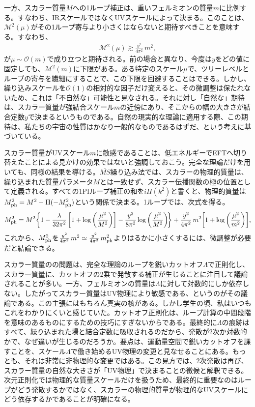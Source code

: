一方、スカラー質量$M$への1ループ補正は、重いフェルミオンの質量$m$に比例する。すなわち、IRスケールではなくUVスケールによって決まる。このことは、$\mathcal{M}^2(\mu)$がその1ループ寄与より小さくはならないと期待すべきことを意味する。すなわち、
%
\begin{align} \label{fine tuning 1}
	\mathcal{M}^2(\mu) \gtrsim \frac{y^2}{4 \pi^2} \, m^2 , 
\end{align}
% 
が$\mu \sim \mathcal{O}(m)$で成り立つと期待される。前の場合と異なり、今度は$y$をどの値に固定しても、$\mathcal{M}^2(m)$に下限がある。ある特定のスケール$\mu$で、ツリーレベルとループの寄与を繊細にすることで、この下限を回避することはできる。しかし、繰り込みスケールを$\mathcal{O}(1)$の相対的な因子だけ変えると、その微調整は保たれないため、これは「不自然な」可能性と見なされる。それに対し「自然な」期待は、スカラー質量が強結合スケール$m$の近傍にあり、そこからの幅の大きさが結合定数$y$で決まるというものである。自然の現実的な理論に適用する際、この期待は、私たちの宇宙の性質はかなり一般的なものであるはずだ、という考えに基づいている。

スカラー質量がUVスケール$m$に敏感であることは、低エネルギーでEFTへ切り替えたことによる見かけの効果ではないと強調しておこう。完全な理論だけを用いても、同様の結果を導ける。$\overline{MS}$繰り込み法では、スカラーの物理的質量は、繰り込まれた質量パラメータ$M$とは一致せず、スカラー伝播関数の極の位置として定義される。すべての1PIループ補正の和を$i \Pi (k^2)$と書くと、物理的質量は$M_{\rm ph}^2 = M^2 - \Pi (-M_{\rm ph}^2)$という関係で決まる。1ループでは、次式を得る。
%
\begin{align}
	M_{\rm ph}^2 = M^2 \! \left\{ 1 - \frac{\lambda}{32 \pi^2} \left[ 1 + \log \left( \frac{\mu^2}{M^2} \right) \right] - \frac{y^2}{8 \pi^2} \log \left( \frac{\mu^2}{M^2} \right) \! \right\} + \frac{y^2}{4 \pi^2} \, m^2 \!\left[ 1 + \log \left( \frac{\mu^2}{m^2} \right) \right] \! , 
\end{align}
%
これから、$M_{\rm ph}^2$を$\frac{y^2}{4 \pi^2} \, m^2 \simeq \frac{y^2}{4 \pi^2} \, m_{\rm ph}^2$よりはるかに小さくするには、微調整が必要だと結論できる。

スカラー質量のの問題は、完全な理論のループを鋭いカットオフ$\Lambda$で正則化し、スカラー質量に、カットオフの2乗で発散する補正が生じることに注目して議論されることが多い。一方、フェルミオンの質量は$\Lambda$に対して対数的にしか依存しない。したがってスカラー質量はUV物理により敏感である、というのがその議論である。この主張にはもちろん真実の核がある。しかし学生の頃、私はいつもこれをわかりにくいと感じていた。カットオフ正則化は、ループ計算の中間段階を意味のあるものにするための技巧にすぎないからである。最終的に$\Lambda$の痕跡はすべて、繰り込まれた場と結合定数に吸収されるのだから、発散が2次か対数的かで、なぜ違いが生じるのだろうか。要点は、運動量空間で鋭いカットオフを課すことを、スケール$\Lambda$で働き始めるUV物理の変更と見なせることにある。もっとも、それは非常に非物理的な変更ではある。この見方では、2次発散は再び、スカラー質量の自然な大きさが「UV物理」で決まることの徴候と解釈できる。次元正則化では物理的な質量スケールだけを扱うため、最終的に重要なのはループがどう発散するかではなく、スカラーの物理的質量が物理的なUVスケールにどう依存するかであることが明確になる。
 
